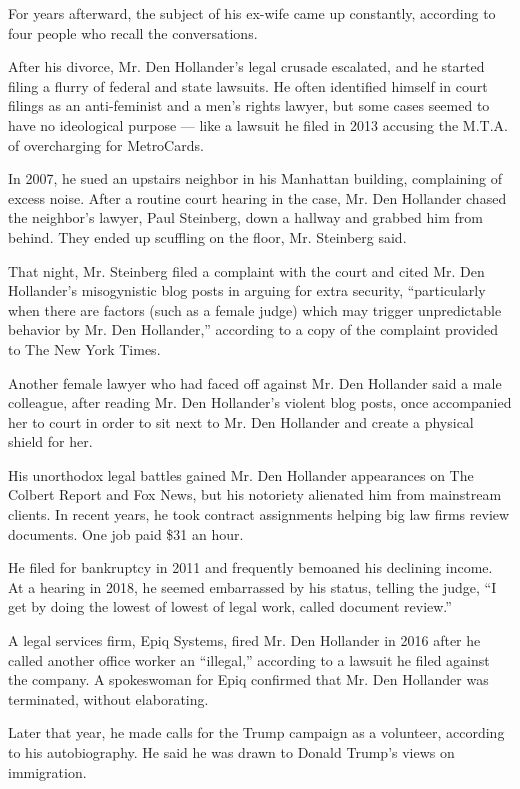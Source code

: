 For years afterward, the subject of his ex-wife came up constantly,
according to four people who recall the conversations.

After his divorce, Mr. Den Hollander's legal crusade escalated, and he
started filing a flurry of federal and state lawsuits. He often
identified himself in court filings as an anti-feminist and a men's
rights lawyer, but some cases seemed to have no ideological purpose ---
like a lawsuit he filed in 2013 accusing the M.T.A. of overcharging for
MetroCards.

In 2007, he sued an upstairs neighbor in his Manhattan building,
complaining of excess noise. After a routine court hearing in the case,
Mr. Den Hollander chased the neighbor's lawyer, Paul Steinberg, down a
hallway and grabbed him from behind. They ended up scuffling on the
floor, Mr. Steinberg said.

That night, Mr. Steinberg filed a complaint with the court and cited Mr.
Den Hollander's misogynistic blog posts in arguing for extra security,
``particularly when there are factors (such as a female judge) which may
trigger unpredictable behavior by Mr. Den Hollander,'' according to a
copy of the complaint provided to The New York Times.

Another female lawyer who had faced off against Mr. Den Hollander said a
male colleague, after reading Mr. Den Hollander's violent blog posts,
once accompanied her to court in order to sit next to Mr. Den Hollander
and create a physical shield for her.

His unorthodox legal battles gained Mr. Den Hollander appearances on The
Colbert Report and Fox News, but his notoriety alienated him from
mainstream clients. In recent years, he took contract assignments
helping big law firms review documents. One job paid \$31 an hour.

He filed for bankruptcy in 2011 and frequently bemoaned his declining
income. At a hearing in 2018, he seemed embarrassed by his status,
telling the judge, ``I get by doing the lowest of lowest of legal work,
called document review.''

A legal services firm, Epiq Systems, fired Mr. Den Hollander in 2016
after he called another office worker an ``illegal,'' according to a
lawsuit he filed against the company. A spokeswoman for Epiq confirmed
that Mr. Den Hollander was terminated, without elaborating.

Later that year, he made calls for the Trump campaign as a volunteer,
according to his autobiography. He said he was drawn to Donald Trump's
views on immigration.

